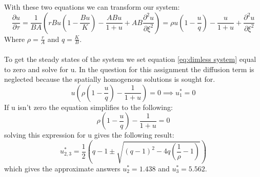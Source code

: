 \documentclass[15pt]{article}
\begin{document}
With these two equations we can transform our system:
\begin{equation}
	\frac{\partial u}{\partial \tau} = \frac{1}{BA} \left( r B u (1 - \frac{Bu}{K}) - \frac{ABu}{1+u} + AB \frac{\partial^2 u}{\partial \xi ^2}\right) = \rho u (1 - \frac{u}{q}) - \frac{u}{1+u} + \frac{\partial^2 u}{\partial \xi^2}
	\label{eq:dimless system}
\end{equation}
Where $\rho = \frac{r}{A}$ and $q = \frac{K}{B}$.
\\ \\
To get the steady states of the system we set equation \ref{eq:dimless system} equal to zero and solve for u. In the question for this assignment the diffusion term is neglected because the spatially homogenous solutions is sought for.
\begin{equation}
	u\left(\rho (1 - \frac{u}{q}) - \frac{1}{1+u}\right) = 0 \implies u^*_1 = 0
\end{equation}
If u isn't zero the equation simplifies to the following:
\begin{equation}
	\rho (1 - \frac{u}{q}) - \frac{1}{1+u} = 0
\end{equation}
solving this expression for u gives the following result:
\begin{equation}
	u^*_{2,3}= \frac{1}{2}\left(q-1 \pm \sqrt{(q-1)^2 -4 q(\frac{1}{\rho} -1 )}\right)
\end{equation}
which gives the approximate answers $u^*_2 = 1.438$ and $u^*_3 = 5.562$.
\end{document}
